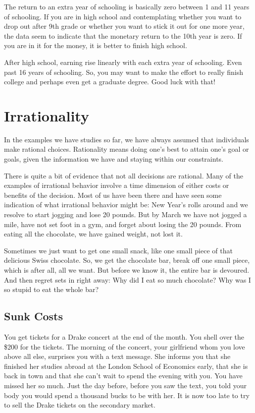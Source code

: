 \documentclass[
]{book}
\begin{document}
The return to an extra year of schooling is basically zero between 1 and 11 years of schooling. If you are in high school and contemplating whether you want to drop out after 9th grade or whether you want to stick it out for one more year, the data seem to indicate that the monetary return to the 10th year is zero. If you are in it for the money, it is better to finish high school.

After high school, earning rise linearly with each extra year of schooling. Even past 16 years of schooling. So, you may want to make the effort to really finish college and perhaps even get a graduate degree. Good luck with that!

\hypertarget{irrationality}{%
\section{Irrationality}\label{irrationality}}

In the examples we have studies so far, we have always assumed that individuals make rational choices. Rationality means doing one's best to attain one's goal or goals, given the information we have and staying within our constraints.

There is quite a bit of evidence that not all decisions are rational. Many of the examples of irrational behavior involve a time dimension of either costs or benefits of the decision. Most of us have been there and have seen some indication of what irrational behavior might be: New Year's rolls around and we resolve to start jogging and lose 20 pounds. But by March we have not jogged a mile, have not set foot in a gym, and forget about losing the 20 pounds. From eating all the chocolate, we have gained weight, not lost it.

Sometimes we just want to get one small snack, like one small piece of that delicious Swiss chocolate. So, we get the chocolate bar, break off one small piece, which is after all, all we want. But before we know it, the entire bar is devoured. And then regret sets in right away: Why did I eat so much chocolate? Why was I so stupid to eat the whole bar?

\hypertarget{sunk-costs}{%
\subsection{Sunk Costs}\label{sunk-costs}}

You get tickets for a Drake concert at the end of the month. You shell over the \$200 for the tickets. The morning of the concert, your girlfriend whom you love above all else, surprises you with a text message. She informs you that she finished her studies abroad at the London School of Economics early, that she is back in town and that she can't wait to spend the evening with you. You have missed her so much. Just the day before, before you saw the text, you told your body you would spend a thousand bucks to be with her. It is now too late to try to sell the Drake tickets on the secondary market.
\end{document}
